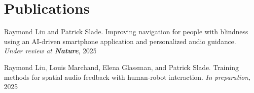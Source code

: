 \documentclass[a4paper,12pt]{article}
\begin{document}
\vspace{-10pt}
\section{Publications}

Raymond Liu and Patrick Slade. Improving navigation for people with blindness using an AI-driven smartphone application and personalized audio guidance. \textit{Under review at \textbf{Nature}}, 2025

Raymond Liu, Louis Marchand, Elena Glassman, and Patrick Slade. Training methods for spatial audio feedback with human-robot interaction. \textit{In preparation}, 2025


\vspace{-2pt}
\end{document}
